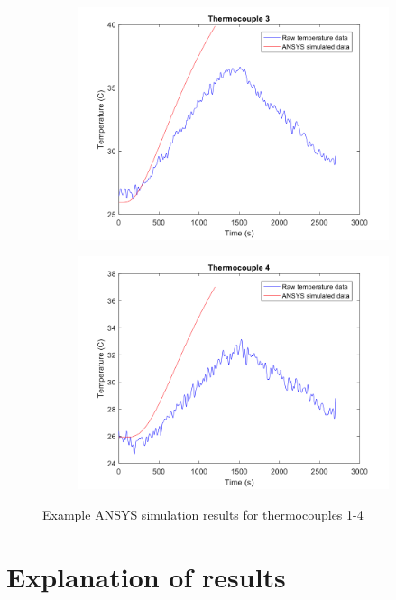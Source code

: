 \documentclass[letterpaper,titlepage,oneside]{report}
\begin{document}
\begin{figure}[ht]
\begin{subfigure}[h]{0.4\textwidth}
    \includegraphics[width=1\textwidth]{ansys3}
  \end{subfigure}
  \quad
  \begin{subfigure}[h]{0.4\textwidth}
    \includegraphics[width=1\textwidth]{ansys4}
  \end{subfigure}
  \caption{Example ANSYS simulation results for thermocouples 1-4}
  \label{fig:ansys}
\end{figure}

\section{Explanation of results}
\end{document}
